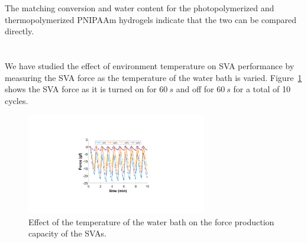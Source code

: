 The matching conversion and water content for the photopolymerized and thermopolymerized PNIPAAm hydrogels indicate that the two can be compared directly.

\section{}
We have studied the effect of environment temperature on SVA performance by measuring the SVA force as the temperature of the water bath is varied. Figure~\ref{fig:envTemp} shows the SVA force as it is turned on for $60~s$ and off for $60~s$ for a total of 10 cycles.
\begin{figure}[!ht]
      \centering
      \includegraphics[width=0.7\textwidth]{envTemp.pdf}
      \caption[]{Effect of the temperature of the water bath on the force production capacity of the SVAs.}
      \label{fig:envTemp}
\end{figure}

